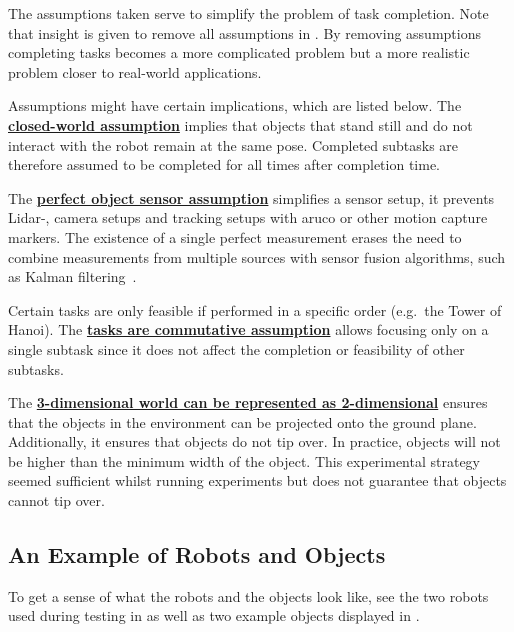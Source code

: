 The assumptions taken serve to simplify the problem of task completion. Note that insight is given to remove all assumptions in . By removing assumptions completing tasks becomes a more complicated problem but a more realistic problem closer to real-world applications.\bs

Assumptions might have certain implications, which are listed below. The \hyperref[assumption:closed_world]{\textbf{closed-world assumption}} implies that objects that stand still and do not interact with the robot remain at the same pose. Completed subtasks are therefore assumed to be completed for all times after completion time.\bs

The \hyperref[assumption:perfect_object_sensor]{\textbf{perfect object sensor assumption}} simplifies a sensor setup, it prevents Lidar-, camera setups and tracking setups with aruco or other motion capture markers. The existence of a single perfect measurement erases the need to combine measurements from multiple sources with sensor fusion algorithms, such as Kalman filtering~\cite{verhaegen_filtering_2007}.\bs

Certain tasks are only feasible if performed in a specific order (e.g.~the Tower of Hanoi). The \hyperref[assumption:order_does_not_matter]{\textbf{tasks are commutative assumption}} allows focusing only on a single subtask since it does not affect the completion or feasibility of other subtasks.\bs

The \hyperref[assumption:no_tipping]{\textbf{3-dimensional world can be represented as 2-dimensional}} ensures that the objects in the environment can be projected onto the ground plane. Additionally, it ensures that objects do not tip over. In practice, objects will not be higher than the minimum width of the object. This experimental strategy seemed sufficient whilst running experiments but does not guarantee that objects cannot tip over.

\subsection{An Example of Robots and Objects}
To get a sense of what the robots and the objects look like, see the two robots used during testing in  as well as two example objects displayed in .

